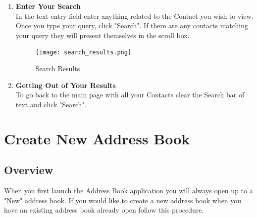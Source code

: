 \documentclass[a4paper, 11pt]{article}
\begin{document}
\begin{enumerate}[label=\textbf{\arabic*})]
    \clearpage
    
    \item{\textbf{Enter Your Search}}\\ In the text entry field enter anything related to the Contact you wish to view. Once you type your query, click "Search". If there are any contacts matching your query they will present themselves in the scroll box.
    
    \begin{figure}[h!]
    \centering
      \texttt{[image: search\_results.png]}
      \caption{Search Results}
    \end{figure} 
    
    \item{\textbf{Getting Out of Your Results}}\\ To go back to the main page with all your Contacts clear the Search bar of text and click "Search".

\end{enumerate}

\clearpage

\section{Create New Address Book}
\subsection{Overview}
When you first launch the Address Book application you will always open up to a "New" address book. If you would like to create a new address book when you have an existing address book already open follow this procedure. 
\end{document}
